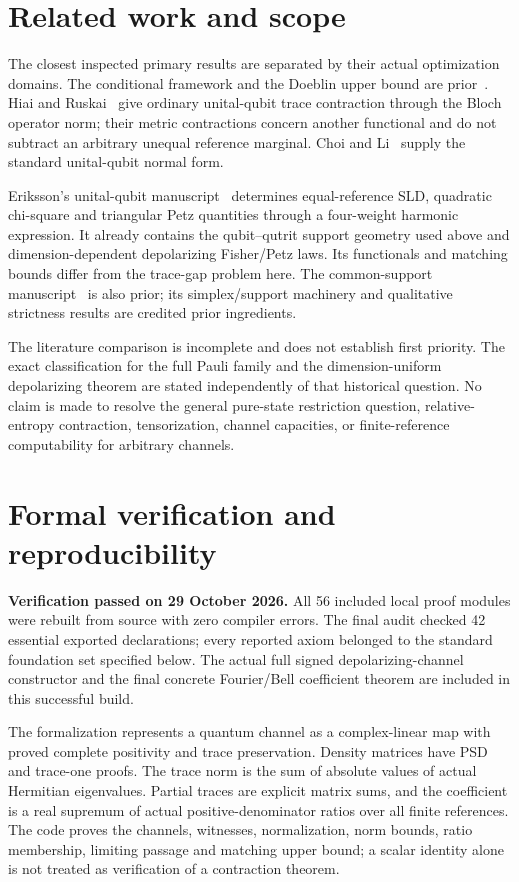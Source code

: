 \documentclass[11pt,a4paper]{article}
\begin{document}
\section{Related work and scope}\label{sec:related}
The closest inspected primary results are separated by their actual optimization domains. The conditional framework and the Doeblin upper bound are prior~\cite{Conditional,Doeblin}. Hiai and Ruskai~\cite{HiaiRuskai} give ordinary unital-qubit trace contraction through the Bloch operator norm; their metric contractions concern another functional and do not subtract an arbitrary unequal reference marginal. Choi and Li~\cite{ChoiLi} supply the standard unital-qubit normal form.

Eriksson's unital-qubit manuscript~\cite{ErikssonUnital} determines equal-reference SLD, quadratic chi-square and triangular Petz quantities through a four-weight harmonic expression. It already contains the qubit--qutrit support geometry used above and dimension-dependent depolarizing Fisher/Petz laws. Its functionals and matching bounds differ from the trace-gap problem here. The common-support manuscript~\cite{ErikssonCQ} is also prior; its simplex/support machinery and qualitative strictness results are credited prior ingredients.

The literature comparison is incomplete and does not establish first priority. The exact classification for the full Pauli family and the dimension-uniform depolarizing theorem are stated independently of that historical question. No claim is made to resolve the general pure-state restriction question, relative-entropy contraction, tensorization, channel capacities, or finite-reference computability for arbitrary channels.

\section{Formal verification and reproducibility}\label{sec:formal}
\textbf{Verification passed on 29 October 2026.}
All 56 included local proof modules were rebuilt from source with zero compiler errors. The final audit checked 42 essential exported declarations; every reported axiom belonged to the standard foundation set specified below. The actual full signed depolarizing-channel constructor and the final concrete Fourier/Bell coefficient theorem are included in this successful build.

The formalization represents a quantum channel as a complex-linear map with proved complete positivity and trace preservation. Density matrices have PSD and trace-one proofs. The trace norm is the sum of absolute values of actual Hermitian eigenvalues. Partial traces are explicit matrix sums, and the coefficient is a real supremum of actual positive-denominator ratios over all finite references. The code proves the channels, witnesses, normalization, norm bounds, ratio membership, limiting passage and matching upper bound; a scalar identity alone is not treated as verification of a contraction theorem.
\end{document}
